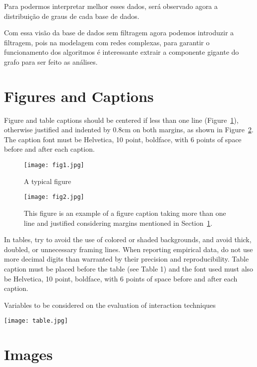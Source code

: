 \documentclass[12pt]{article}
\begin{document}
Para podermos interpretar melhor esses dados, será observado agora a distribuição de graus de cada base de dados.







Com essa visão da base de dados sem filtragem agora podemos introduzir a filtragem, pois na modelagem com redes complexas, para garantir o funcionamento dos algoritmos é interessante extrair a componente gigante do grafo para ser feito as análises.


\section{Figures and Captions}\label{sec:figs}


Figure and table captions should be centered if less than one line
(Figure~\ref{fig:exampleFig1}), otherwise justified and indented by 0.8cm on
both margins, as shown in Figure~\ref{fig:exampleFig2}. The caption font must
be Helvetica, 10 point, boldface, with 6 points of space before and after each
caption.

\begin{figure}[ht]
\centering
\texttt{[image: fig1.jpg]}
\caption{A typical figure}
\label{fig:exampleFig1}
\end{figure}

\begin{figure}[ht]
\centering
\texttt{[image: fig2.jpg]}
\caption{This figure is an example of a figure caption taking more than one
  line and justified considering margins mentioned in Section~\ref{sec:figs}.}
\label{fig:exampleFig2}
\end{figure}

In tables, try to avoid the use of colored or shaded backgrounds, and avoid
thick, doubled, or unnecessary framing lines. When reporting empirical data,
do not use more decimal digits than warranted by their precision and
reproducibility. Table caption must be placed before the table (see Table 1)
and the font used must also be Helvetica, 10 point, boldface, with 6 points of
space before and after each caption.

\begin{table}[ht]
\centering
\caption{Variables to be considered on the evaluation of interaction
  techniques}
\label{tab:exTable1}
\texttt{[image: table.jpg]}
\end{table}

\section{Images}
\end{document}
